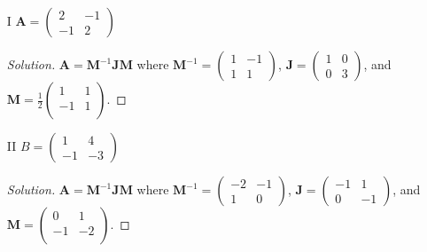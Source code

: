 \documentclass{article}
\newenvironment{solution}{\begin{proof}[Solution]}{\end{proof}}
\begin{document}
\begin{enumerate}
    \item[I] $\mathbf A = \begin{pmatrix}
        2 & -1 \\
        -1 & 2
    \end{pmatrix}$

    \begin{solution}
        $\mathbf A = \mathbf M^{-1} \mathbf J \mathbf M$
        where
        $\mathbf M^{-1}
         = \begin{pmatrix}
            1 & -1 \\
            1 & 1
        \end{pmatrix}$,
        $\mathbf 
        J = \begin{pmatrix}
            1 & 0 \\
            0 & 3
        \end{pmatrix}$, and
        $\mathbf 
        M = \frac{1}{2}\begin{pmatrix}
            1 & 1 \\
            -1 & 1 \\
        \end{pmatrix}$.
    \end{solution}


    \item[II] $B = \begin{pmatrix}
        1 & 4 \\
        -1 & -3
    \end{pmatrix}$

    \begin{solution}
        $\mathbf A = \mathbf M^{-1} \mathbf J \mathbf M$
        where
        $\mathbf M^{-1}
         = \begin{pmatrix}
            -2 & -1 \\
            1 & 0
        \end{pmatrix}$,
        $\mathbf 
        J = \begin{pmatrix}
            -1 & 1 \\
            0 & -1
        \end{pmatrix}$, and
        $\mathbf 
        M = \begin{pmatrix}
            0 & 1 \\
            -1 & -2 \\
        \end{pmatrix}$.

    \end{solution}





\end{enumerate}
\end{document}
